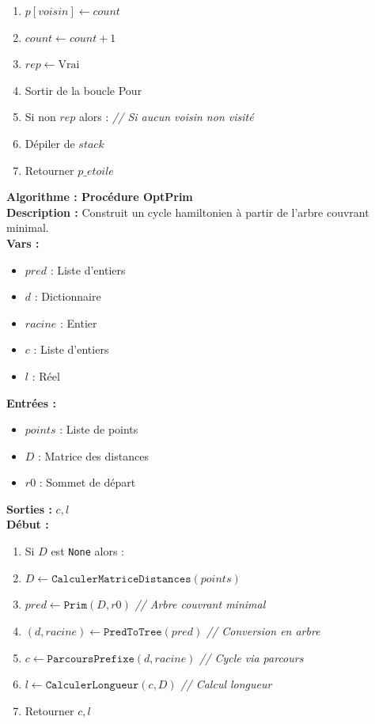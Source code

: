 \documentclass[a4paper, 12pt]{article}
\begin{document}
\begin{tcolorbox}[colback=darkWhite!75!white,colframe=black!30,left=5pt,right=5pt,top=5pt,bottom=5pt]
\begin{enumerate}
    \item \quad \quad \quad $p[voisin] \leftarrow count$
    \item \quad \quad \quad $count \leftarrow count + 1$
    \item \quad \quad \quad $rep \leftarrow \text{Vrai}$
    \item \quad \quad \quad Sortir de la boucle Pour
    \item \quad Si non $rep$ alors : \textit{// Si aucun voisin non visité}
    \item \quad \quad Dépiler de $stack$
    \item Retourner $p\_etoile$
\end{enumerate}
\end{tcolorbox}

\vspace{5mm}

\begin{tcolorbox}[colback=darkWhite!75!white,colframe=black!30,left=5pt,right=5pt,top=5pt,bottom=5pt]
\textbf{Algorithme : Procédure OptPrim} \\
\textbf{Description :} Construit un cycle hamiltonien à partir de l'arbre couvrant minimal. \\
\textbf{Vars :}
\begin{itemize}
    \item $pred$ : Liste d'entiers
    \item $d$ : Dictionnaire
    \item $racine$ : Entier
    \item $c$ : Liste d'entiers
    \item $l$ : Réel
\end{itemize}
\textbf{Entrées :}
\begin{itemize}
    \item $points$ : Liste de points
    \item $D$ : Matrice des distances
    \item $r0$ : Sommet de départ
\end{itemize}
\textbf{Sorties :} $c, l$ \\
\textbf{Début :}
\begin{enumerate}
    \item Si $D$ est \texttt{None} alors :
    \item \quad $D \leftarrow \texttt{CalculerMatriceDistances}(points)$
    \item $pred \leftarrow \texttt{Prim}(D, r0)$ \textit{// Arbre couvrant minimal}
    \item $(d, racine) \leftarrow \texttt{PredToTree}(pred)$ \textit{// Conversion en arbre}
    \item $c \leftarrow \texttt{ParcoursPrefixe}(d, racine)$ \textit{// Cycle via parcours}
    \item $l \leftarrow \texttt{CalculerLongueur}(c, D)$ \textit{// Calcul longueur}
    \item Retourner $c, l$
\end{enumerate}
\end{tcolorbox}
\end{document}
